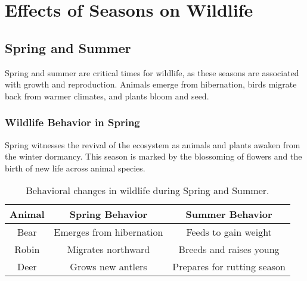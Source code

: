 \chapter{Effects of Seasons on Wildlife}

\section{Spring and Summer}

Spring and summer are critical times for wildlife, as these seasons are associated with growth and reproduction. Animals emerge from hibernation, birds migrate back from warmer climates, and plants bloom and seed.

\subsection{Wildlife Behavior in Spring}

Spring witnesses the revival of the ecosystem as animals and plants awaken from the winter dormancy. This season is marked by the blossoming of flowers and the birth of new life across animal species.

\begin{table}[h]
	\centering
	\begin{tabular}{|c|c|c|}
		\hline
		\textbf{Animal} & \textbf{Spring Behavior} & \textbf{Summer Behavior} \\
		\hline
		Bear & Emerges from hibernation & Feeds to gain weight \\
		\hline
		Robin & Migrates northward & Breeds and raises young \\
		\hline
		Deer & Grows new antlers & Prepares for rutting season \\
		\hline
	\end{tabular}
	\caption{Behavioral changes in wildlife during Spring and Summer.}
	\label{tab:wildlife_behavior}
\end{table}
